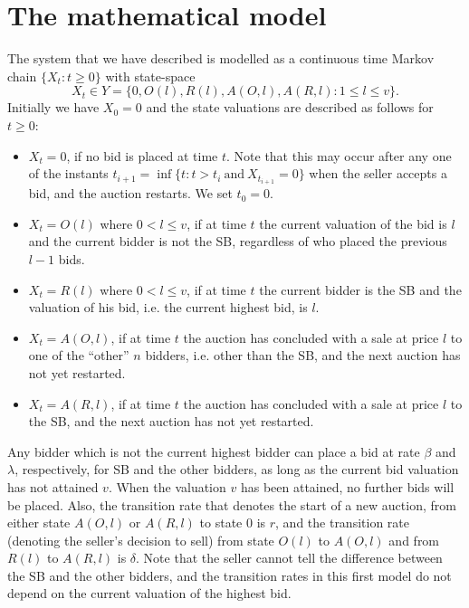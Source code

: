 \documentclass{comjnl}
\begin{document}
\section{The mathematical model} \label{Model}

The system that we have described is modelled as a continuous time
Markov chain $\{X_t : t \geq 0\}$ with state-space
\begin{equation}\label{eq:statespaceY}
X_t\in Y =\{0, O(l),R(l),A(O,l),A(R,l):1\leq l \leq v\}.
\end{equation}
Initially we have $X_0=0$ and the state valuations are described
as follows for $t\geq 0$:
\begin{itemize}
\item $X_{t}=0$, if no bid is placed at time $t$. Note that this
may occur after any one of the instants
$t_{i+1}=\inf\{t:t>t_i~\textrm{and}~X_{t_{i+1}}=0\}$ when the
seller accepts a bid, and the auction restarts. We set $t_0=0$.

\item $X_{t}=O(l)$ where $0 < l\leq v$, if at time $t$ the current
valuation of the bid is $l$ and the current bidder is not the SB,
regardless of who placed the previous $l-1$ bids.

\item $X_{t}=R(l)$ where $0 < l\leq v$, if at time $t$ the current
bidder is the SB and the valuation of his bid, i.e. the current
highest bid, is $l$.

\item $X_{t}=A(O,l)$, if at time $t$ the auction has concluded
with a sale at price $l$ to one of the ``other'' $n$ bidders, i.e.
other than the SB, and the next auction has not yet restarted.

\item $X_{t}=A(R,l)$, if at time $t$ the auction has concluded
with a sale at price $l$ to the SB, and the next auction has not
yet restarted.

\end{itemize}
Any bidder which is not the current highest bidder can place a bid
at rate $\beta$ and $\lambda$, respectively, for SB and the other
bidders, as long as the current bid valuation has not attained
$v$. When the valuation $v$ has been attained, no further bids
will be placed. Also, the transition rate that denotes the start
of a new auction, from either state $A(O,l)$ or $A(R,l)$ to state
$0$ is $r$, and  the transition rate (denoting the seller's
decision to sell) from state $O(l)$ to $A(O,l)$ and from $R(l)$ to
$A(R,l)$ is $\delta$. Note that the seller cannot tell the
difference between the SB and the other bidders, and the
transition rates in this first model do not depend on the current
valuation of the highest bid.
\end{document}
